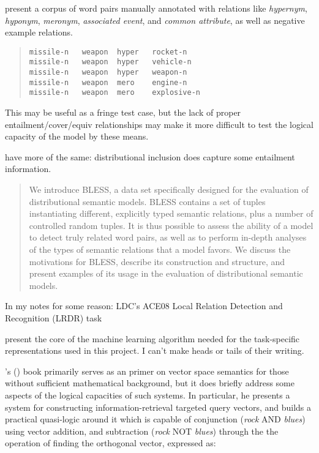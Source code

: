\documentclass[12pt,leqno,tbtags,twoside]{article}
\theoremstyle{dotless}
\def\citeapos#1{\citeauthor{#1}'s (\citeyear{#1})}
\begin{document}
\citet{baroni2011we} present a corpus of word pairs manually annotated with relations like \textit{hypernym}, \textit{hyponym}, \textit{meronym}, \textit{associated event}, and \textit{common attribute}, as well as negative example relations.

\begin{quote}
\begin{verbatim}
missile-n	weapon	hyper	rocket-n
missile-n	weapon	hyper	vehicle-n
missile-n	weapon	hyper	weapon-n
missile-n	weapon	mero	engine-n
missile-n	weapon	mero	explosive-n
\end{verbatim}
\end{quote}

This may be useful as a fringe test case, but the lack of proper entailment/cover/equiv relationships may make it more difficult to test the logical capacity of the model by these means.

\citet{lenci2012identifying} have more of the same: distributional inclusion does capture some entailment information.

\begin{quote}
We introduce BLESS, a data set specifically
designed for the evaluation of distributional
semantic models. BLESS contains a set of tuples instantiating different, explicitly typed semantic relations, plus a number of controlled
random tuples. It is thus possible to assess the
ability of a model to detect truly related word
pairs, as well as to perform in-depth analyses of the types of semantic relations that a
model favors. We discuss the motivations for
BLESS, describe its construction and structure, and present examples of its usage in the
evaluation of distributional semantic models.
\end{quote}

In my notes for some reason: LDC's ACE08 Local Relation Detection and Recognition (LRDR) task

\citet{goller1996learning} present the core of the machine learning algorithm needed for the task-specific representations used in this project. I can't make heads or tails of their writing.

\citeapos{widdows2004geometry} book primarily serves as an primer on vector space semantics for those without sufficient mathematical background, but it does briefly address some aspects of the logical capacities of such systems. In particular, he presents a system for constructing information-retrieval targeted query vectors, and builds a practical quasi-logic around it which is capable of conjunction (\textit{rock} AND \textit{blues}) using vector addition, and subtraction (\textit{rock} NOT \textit{blues}) through the the operation of finding the orthogonal vector, expressed as:
\end{document}
